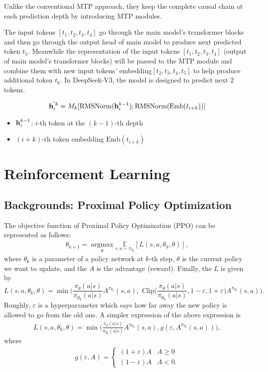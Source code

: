 Unlike the conventional MTP approach, they keep the complete causal chain at each prediction depth by introducing MTP modules.

The input tokens $[t_1,t_2,t_3,t_4]$ go through the main model's transformer blocks and then go through the output head of main model to produce next predicted token $t_5$. Meanwhile the representation of the input tokens $[t_1,t_2,t_3,t_4]$ (\ie output of main model's transformer blocks) will be passed to the MTP module and combine them with new input tokens' embedding$[t_2,t_3,t_4,t_5]$ to help produce additional token $t_6$. In DeepSeek-V3, the model is designed to predict next 2 tokens.

\begin{align*}
	{\mathbf{h}}_i^{'k} = M_k[\text{RMSNorm}({\mathbf{h}}_i^{k-1}); \text{RMSNorm}(\text{Emb}(t_{i+k}))]
\end{align*}
\begin{itemize}
	\item ${\mathbf{h}}_i^{k-1}$: $i$-th token at the $(k-1)$-th depth 
	\item $(i+k)$-th token embedding $\text{Emb}(t_{i+k})$
\end{itemize}

\section{Reinforcement Learning}
\subsection{Backgrounds: Proximal Policy Optimization}
The objective function of Proximal Policy Optimization (PPO) can be represented as follows:
\begin{align*}
	\theta_{k+1} = \underset{\theta}{\operatorname{argmax}} \underset{s,a\sim \pi_{\theta_k}}{\mathbb{E}} [L(s, a, \theta_k, \theta)],
\end{align*}
where $\theta_{k}$ is a parameter of a policy network at $k$-th step, $\theta$ is the current policy we want to update, and the $A$ is the advantage (\ie reward). Finally, the $L$ is given by
$$L(s, a, \theta_k, \theta) = \min \Bigg(\frac{\pi_{\theta}\left(a | s\right)}{\pi_{\theta_{\text {k}}}\left(a | s\right)} A^{\pi_{\theta_k}}(s,a), \textrm{ Clip}\Bigg(\frac{\pi_{\theta}\left(a | s\right)}{\pi_{\theta_{\text {k}}}\left(a | s\right)}, 1-\varepsilon, 1+\varepsilon\Bigg) A^{\pi_{\theta_k}}(s,a)\Bigg).$$
Roughly, $\varepsilon$ is a hyperparameter which says how far away the new policy is allowed to go from the old one. A simpler expression of the above expression is
\begin{align}
	L(s, a, \theta_k, \theta) = \min \Bigg(\frac{\pi_{\theta}\left(a | s\right)}{\pi_{\theta_{\text {k}}}\left(a | s\right)} A^{\pi_{\theta_k}}(s,a), g(\varepsilon, A^{\pi_{\theta_k}}(s,a)) \Bigg),
	\label{eq:ppo_objective}
\end{align}
where 
\begin{align}
	g(\varepsilon,A) = 
	\begin{cases}
		(1+\varepsilon)A & A\geq 0\\
		(1-\varepsilon)A & A< 0.
	\end{cases}
	\label{eq:ppo_clip}
\end{align}

